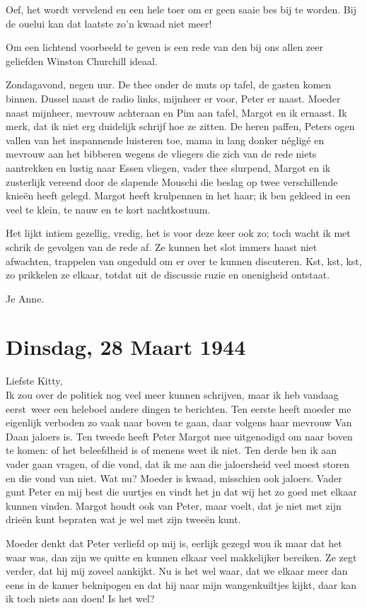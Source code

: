 \documentclass{book}
\begin{document}
Oef, het wordt vervelend en een hele toer om er geen saaie bes bij te
worden. Bij de ouelui kan dat laatste zo'n kwaad niet meer!

Om een lichtend voorbeeld te geven is een rede van den bij ons allen
zeer geliefden Winston Churchill ideaal.

Zondagavond, negen uur. De thee onder de muts op tafel, de gasten komen
binnen. Dussel naast de radio links, mijnheer er voor, Peter er naast.
Moeder naast mijnheer, mevrouw achteraan en Pim aan tafel, Margot en ik
ernaast. Ik merk, dat ik niet erg duidelijk schrijf hoe ze zitten. De
heren paffen, Peters ogen vallen van het inspannende luisteren toe, mama
in lang donker négligé en mevrouw aan het bibberen wegens de vliegers
die zich van de rede niets aantrekken en lustig naar Essen vliegen,
vader thee slurpend, Margot en ik zusterlijk vereend door de slapende
Mouschi die beslag op twee verschillende knieën heeft gelegd. Margot
heeft krulpennen in het haar; ik ben gekleed in een veel te klein, te
nauw en te kort nachtkostuum.

Het lijkt intiem gezellig, vredig, het is voor deze keer ook zo; toch
wacht ik met schrik de gevolgen van de rede af. Ze kunnen het slot
immers haast niet afwachten, trappelen van ongeduld om er over te kunnen
discuteren. Kst, kst, kst, zo prikkelen ze elkaar, totdat uit de
discussie ruzie en onenigheid ontstaat.

Je Anne.

\chapter{Dinsdag, 28 Maart 1944}

Liefste Kitty,\\Ik zou over de politiek nog veel meer kunnen schrijven,
maar ik heb vandaag eerst~weer een heleboel andere dingen te berichten.
Ten eerste heeft moeder me eigenlijk verboden zo vaak naar boven te
gaan, daar volgens haar mevrouw Van Daan jaloers is. Ten tweede heeft
Peter Margot mee uitgenodigd om naar boven te komen: of het beleefdheid
is of menens weet ik niet. Ten derde ben ik aan vader gaan vragen, of
die vond, dat ik me aan die jaloersheid veel moest storen en die vond
van niet. Wat nu? Moeder is kwaad, misschien ook jaloers. Vader gunt
Peter en mij best die uurtjes en vindt het jn dat wij het zo goed met
elkaar kunnen vinden. Margot houdt ook van Peter, maar voelt, dat je
niet met zijn drieën kunt bepraten wat je wel met zijn tweeën kunt.

Moeder denkt dat Peter verliefd op mij is, eerlijk gezegd wou ik maar
dat het waar was, dan zijn we quitte en kunnen elkaar veel makkelijker
bereiken. Ze zegt verder, dat hij mij zoveel aankijkt. Nu is het wel
waar, dat we elkaar meer dan eens in de kamer beknipogen en dat hij naar
mijn wangenkuiltjes kijkt, daar kan ik toch niets aan doen! Is het wel?
\end{document}
